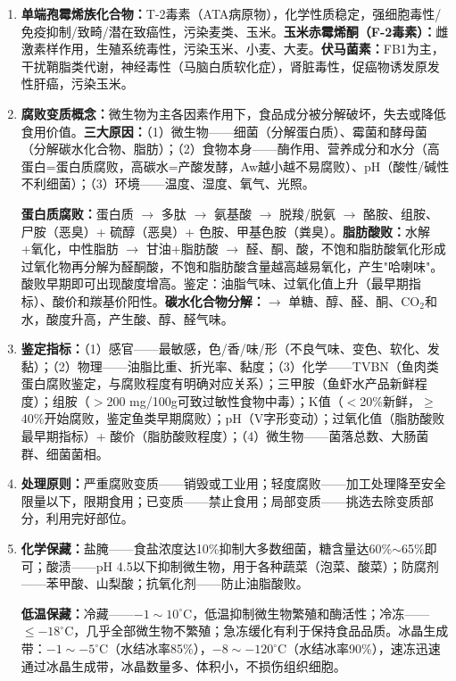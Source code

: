 {\begin{enumerate}[leftmargin=*, itemsep=6pt]
    \item \textbf{单端孢霉烯族化合物：}T-2毒素（ATA病原物），化学性质稳定，强细胞毒性/免疫抑制/致畸/潜在致癌性，污染麦类、玉米。\textbf{玉米赤霉烯酮（F-2毒素）：}雌激素样作用，生殖系统毒性，污染玉米、小麦、大麦。\textbf{伏马菌素：}FB1为主，干扰鞘脂类代谢，神经毒性（马脑白质软化症），肾脏毒性，促癌物诱发原发性肝癌，污染玉米。

    \item \textbf{腐败变质概念：}微生物为主各因素作用下，食品成分被分解破坏，失去或降低食用价值。\textbf{三大原因：}（1）微生物——细菌（分解蛋白质）、霉菌和酵母菌（分解碳水化合物、脂肪）；（2）食物本身——酶作用、营养成分和水分（高蛋白=蛋白质腐败，高碳水=产酸发酵，Aw越小越不易腐败）、pH（酸性/碱性不利细菌）；（3）环境——温度、湿度、氧气、光照。

    \textbf{蛋白质腐败：}蛋白质 $\rightarrow$ 多肽 $\rightarrow$ 氨基酸 $\rightarrow$ 脱羧/脱氨 $\rightarrow$ 酪胺、组胺、尸胺（恶臭）+ 硫醇（恶臭）+ 色胺、甲基色胺（粪臭）。\textbf{脂肪酸败：}水解+氧化，中性脂肪 $\rightarrow$ 甘油+脂肪酸 $\rightarrow$ 醛、酮、酸，不饱和脂肪酸氧化形成过氧化物再分解为醛酮酸，不饱和脂肪酸含量越高越易氧化，产生"哈喇味"。酸败早期即可出现酸度增高。鉴定：油脂气味、过氧化值上升（最早期指标）、酸价和羰基价阳性。\textbf{碳水化合物分解：}$\rightarrow$ 单糖、醇、醛、酮、CO$_2$和水，酸度升高，产生酸、醇、醛气味。

    \item \textbf{鉴定指标：}（1）感官——最敏感，色/香/味/形（不良气味、变色、软化、发黏）；（2）物理——油脂比重、折光率、黏度；（3）化学——TVBN（鱼肉类蛋白腐败鉴定，与腐败程度有明确对应关系）；三甲胺（鱼虾水产品新鲜程度）；组胺（$>$200 mg/100g可致过敏性食物中毒）；K值（$<$20\%新鲜，$\geq$40\%开始腐败，鉴定鱼类早期腐败）；pH（V字形变动）；过氧化值（脂肪酸败最早期指标）+ 酸价（脂肪酸败程度）；（4）微生物——菌落总数、大肠菌群、细菌菌相。

    \item \textbf{处理原则：}严重腐败变质——销毁或工业用；轻度腐败——加工处理降至安全限量以下，限期食用；已变质——禁止食用；局部变质——挑选去除变质部分，利用完好部位。

    \item \textbf{化学保藏：}盐腌——食盐浓度达10\%抑制大多数细菌，糖含量达60\%$\sim$65\%即可；酸渍——pH 4.5以下抑制微生物，用于各种蔬菜（泡菜、酸菜）；防腐剂——苯甲酸、山梨酸；抗氧化剂——防止油脂酸败。

    \textbf{低温保藏：}冷藏——$-1\sim10^\circ$C，低温抑制微生物繁殖和酶活性；冷冻——$\leq-18^\circ$C，几乎全部微生物不繁殖；急冻缓化有利于保持食品品质。冰晶生成带：$-1\sim-5^\circ$C（水结冰率85\%），$-8\sim-120^\circ$C（水结冰率90\%），速冻迅速通过冰晶生成带，冰晶数量多、体积小，不损伤组织细胞。


\end{enumerate}}
